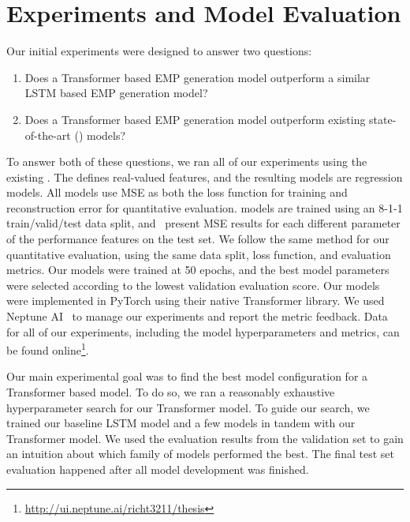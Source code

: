 \section{Experiments and Model Evaluation}\label{sec:experiments-and-evaluation}
Our initial experiments were designed to answer two questions: 
\begin{enumerate}
    \item Does a Transformer based EMP generation model outperform a similar LSTM based EMP generation model?
    \item Does a Transformer based EMP generation model outperform existing state-of-the-art (\vnet{}) models?
\end{enumerate}
To answer both of these questions, we ran all of our experiments using the existing \vnetf{}. The \vnetf{} defines real-valued features, and the resulting models are regression models. All \vnet{} models use MSE as both the loss function for training and reconstruction error for quantitative evaluation. \vnet{} models are trained using an 8-1-1 train/valid/test data split, and~\citet{jeong2019virtuosonet} present MSE results for each different parameter of the performance features on the test set. We follow the same method for our quantitative evaluation, using the same data split, loss function, and evaluation metrics. Our models were trained at 50 epochs, and the best model parameters were selected according to the lowest validation evaluation score. Our models were implemented in PyTorch using their native Transformer library. We used Neptune AI~\cite{neptune} to manage our experiments and report the metric feedback. Data for all of our experiments, including the model hyperparameters and metrics, can be found online\footnote{\url{http://ui.neptune.ai/richt3211/thesis}}. 

Our main experimental goal was to find the best model configuration for a Transformer based model. To do so, we ran a reasonably exhaustive hyperparameter search for our Transformer model. To guide our search, we trained our baseline LSTM model and a few \vnet{} models in tandem with our Transformer model. We used the evaluation results from the validation set to gain an intuition about which family of models performed the best. The final test set evaluation happened after all model development was finished. 

